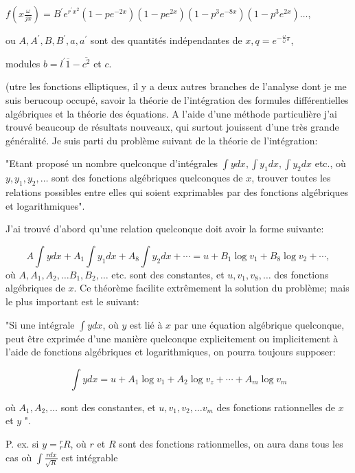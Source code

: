 \documentclass{article}
\begin{document}
\(f\left(x \frac{\omega}{j x}\right)=B^{\prime} e^{r^{\prime} x^{2}}\left(1-p e^{-2 x}\right)\left(1-p e^{2 x}\right)\left(1-p^{3} e^{-8 x}\right)\left(1-p^{3} e^{2 x}\right) \ldots\),

ou \(A, A^{\prime}, B, B^{\prime}, a, a^{\prime}\) sont des quantités indépendantes de \(x, q=e^{-\frac{\omega}{\omega} \pi}\),


modules \(b=l^{\prime} \overline{1}-\overline{c^{2}}\) et \(c\).

(utre les fonctions elliptiques, il y a deux autres branches de l'analyse dont je me suis berucoup occupé, savoir la théorie de l'intégration des formules différentielles algébriques et la théorie des équations. A l'aide d'une méthode particulière j'ai trouvé beaucoup de résultats nouveaux, qui surtout jouissent d'une très grande généralité. Je suis parti du problème suivant de la théorie de l'intégration:

"Etant proposé un nombre quelconque d'intégrales \(\int y d x, \int y_{1} d x, \int y_{2} d x\) etc., où \(y, y_{1}, y_{2}, \ldots\) sont des fonctions algébriques quelconques de \(x\), trouver toutes les relations possibles entre elles qui soient exprimables par des fonctions algébriques et logarithmiques".

J'ai trouvé d'abord qu'une relation quelconque doit avoir la forme suivante:

\[
A \int y d x+A_{1} \int y_{1} d x+A_{8} \int y_{2} d x+\cdots=u+B_{1} \log v_{1}+B_{8} \log v_{2}+\cdots,
\]
où \(A, A_{1}, A_{2}, \ldots B_{1}, B_{2}, \ldots\) etc. sont des constantes, et \(u, v_{1}, v_{8}, \ldots\) des fonctions algébriques de \(x\). Ce théorème facilite extrêmement la solution du problème; mais le plus important est le suivant:

"Si une intégrale \(\int y d x\), où \(y\) est lié à \(x\) par une équation algébrique quelconque, peut être exprimée d'une manière quelconque explicitement ou implicitement à l'aide de fonctions algébriques et logarithmiques, on pourra toujours supposer:

\[
\int y d x=u+A_{1} \log v_{1}+A_{2} \log v_{z}+\cdots+A_{m} \log v_{m}
\]

où \(A_{1}, A_{2}, \ldots\) sont des constantes, et \(u, v_{1}, v_{2}, \ldots v_{m}\) des fonctions rationnelles de \(x\) et \(y\) ".

P. ex. si \(y={ }_{r}^{r} R\), où \(r\) et \(R\) sont des fonctions rationmelles, on aura dans tous les cas où \(\int \frac{r d x}{\sqrt{R}}\) est intégrable
\end{document}
